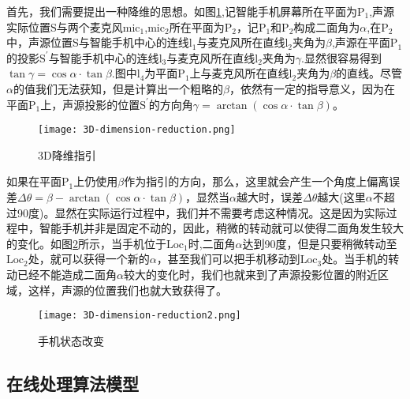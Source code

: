 \documentclass[winfonts,oneside]{njuthesis}
\begin{document}
			首先，我们需要提出一种降维的思想。如图\ref{fig: 3D-dimension-reduction},记智能手机屏幕所在平面为$\text{P}_1$,声源实际位置$\text{S}$与两个麦克风$\text{mic}_1$,$\text{mic}_2$所在平面为$\text{P}_2$，记$\text{P}_1$和$\text{P}_2$构成二面角为$\alpha$,在$\text{P}_2$中，声源位置$\text{S}$与智能手机中心的连线$\text{l}_1$与麦克风所在直线$\text{l}_2$夹角为$\beta$,声源在平面$\text{P}_1$的投影$\text{S}^{'}$与智能手机中心的连线$\text{l}_3$与麦克风所在直线$\text{l}_2$夹角为$\gamma$.显然很容易得到$\tan \gamma = \cos \alpha \cdot \tan \beta$.图中$\text{l}_4$为平面$\text{P}_1$上与麦克风所在直线$\text{l}_2$夹角为$\beta$的直线。尽管$\alpha$的值我们无法获知，但是计算出一个粗略的$\beta$，依然有一定的指导意义，因为在平面$\text{P}_1$上，声源投影的位置$\text{S}^{'}$的方向角$\gamma = \arctan (\cos \alpha \cdot \tan \beta)$。
			
			\begin{figure}[H]
				\centering
				\texttt{[image: 3D-dimension-reduction.png]} 
				\caption{{3D降维指引}}
				\label{fig: 3D-dimension-reduction}
			\end{figure}
			
			如果在平面$\text{P}_1$上仍使用$\beta$作为指引的方向，那么，这里就会产生一个角度上偏离误差$\Delta \theta = \beta - \arctan (\cos \alpha \cdot \tan \beta)$，显然当$\alpha$越大时，误差$\Delta \theta$越大(这里$\alpha$不超过90度)。显然在实际运行过程中，我们并不需要考虑这种情况。这是因为实际过程中，智能手机并非是固定不动的，因此，稍微的转动就可以使得二面角发生较大的变化。如图\ref{fig: 3D-dimension-reduction2}所示，当手机位于$\text{Loc}_1$时,二面角$\alpha$达到90度，但是只要稍微转动至$\text{Loc}_2$处，就可以获得一个新的$\alpha$，甚至我们可以把手机移动到$\text{Loc}_3$处。当手机的转动已经不能造成二面角$\alpha$较大的变化时，我们也就来到了声源投影位置的附近区域，这样，声源的位置我们也就大致获得了。
			
			\begin{figure}[H]
				\centering
				\texttt{[image: 3D-dimension-reduction2.png]} 
				\caption{{手机状态改变}}
				\label{fig: 3D-dimension-reduction2}
			\end{figure}	
		
		\subsection{在线处理算法模型}
			
\end{document}
